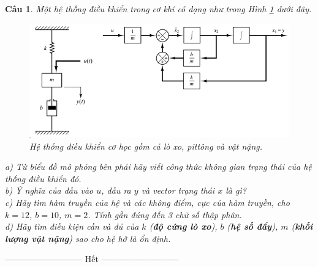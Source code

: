 \documentclass[11pt]{article}
\newtheorem{bt}{Câu}
\begin{document}
\begin{bt}\label{Câu 1}
Một hệ thống điều khiển trong cơ khí có dạng như trong Hình \ref{fig:mechanicalsystem} dưới đây. 

\begin{figure}[!h]
	\centering
	\includegraphics[width=0.7\linewidth]{Mechanical_System}
	\caption[Hệ thống điều khiển cơ học]{Hệ thống điều khiển cơ học gồm cả lò xo, pittông và vật nặng.}
	\label{fig:mechanicalsystem}
\end{figure}

\noindent a) Từ biểu đồ mô phỏng bên phải hãy viết công thức không gian trạng thái của hệ thống điều khiển đó. \\
b) Ý nghĩa của đầu vào $u$, đầu ra $y$ và vector trạng thái $x$ là gì? \\
c) Hãy tìm hàm truyền của hệ và các không điểm, cực của hàm truyền, cho $k = 12$, $b = 10$, $m = 2$. Tính gần đúng đến 3 chữ số thập phân. \\
d) Hãy tìm điều kiện cần và đủ của $k$ (\textbf{độ cứng lò xo}), $b$ (\textbf{hệ số đẩy}), $m$ (\textbf{khối lượng vật nặng}) sao cho hệ hở là ổn định.
\end{bt}

\begin{center}
	--------------------------- Hết ---------------------------
\end{center}

\newpage
\end{document}
